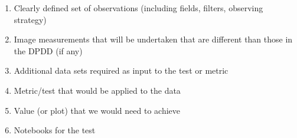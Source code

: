 \documentclass[modern]{desc-tex/styles/lsstdescnote}
\begin{document}
\begin{enumerate}
\item Clearly defined set of observations (including fields, filters, observing strategy)
\item Image measurements that will be undertaken that are different than those in the DPDD (if any)
\item Additional data sets required as input to the test or metric
\item Metric/test that would be applied to the data
\item Value (or plot) that we would need to achieve
\item Notebooks for the test
\end{enumerate}

\begin{acknowledgments}
% 
\end{acknowledgments}
  

\end{document}
